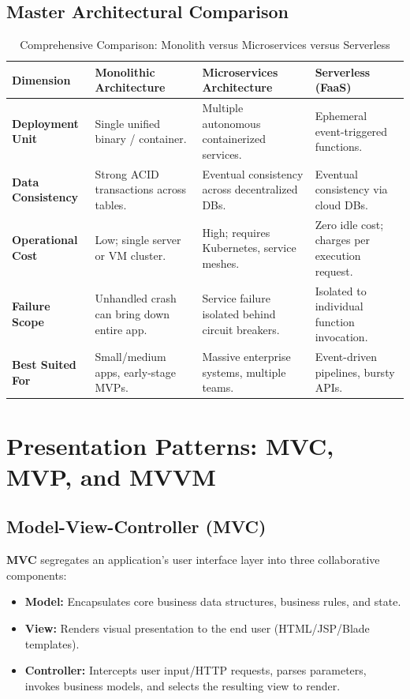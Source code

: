 \subsection{Master Architectural Comparison}
\begin{table}[htbp]
\centering
\small
\caption{Comprehensive Comparison: Monolith versus Microservices versus Serverless}
\label{tab:monolith_vs_microservices_vs_serverless}
\begin{tabularx}{\textwidth}{l p{3.8cm} p{4.2cm} X}
\toprule
\textbf{Dimension} & \textbf{Monolithic Architecture} & \textbf{Microservices Architecture} & \textbf{Serverless (FaaS)} \\
\midrule
\textbf{Deployment Unit} & Single unified binary / container. & Multiple autonomous containerized services. & Ephemeral event-triggered functions. \\
\textbf{Data Consistency} & Strong ACID transactions across tables. & Eventual consistency across decentralized DBs. & Eventual consistency via cloud DBs. \\
\textbf{Operational Cost} & Low; single server or VM cluster. & High; requires Kubernetes, service meshes. & Zero idle cost; charges per execution request. \\
\textbf{Failure Scope} & Unhandled crash can bring down entire app. & Service failure isolated behind circuit breakers. & Isolated to individual function invocation. \\
\textbf{Best Suited For} & Small/medium apps, early-stage MVPs. & Massive enterprise systems, multiple teams. & Event-driven pipelines, bursty APIs. \\
\bottomrule
\end{tabularx}
\end{table}

\section{Presentation Patterns: MVC, MVP, and MVVM}
\label{sec:se_mvc_mvp_mvvm}

\subsection{Model-View-Controller (MVC)}
\textbf{MVC} segregates an application's user interface layer into three collaborative components:
\begin{itemize}
    \item \textbf{Model:} Encapsulates core business data structures, business rules, and state.
    \item \textbf{View:} Renders visual presentation to the end user (HTML/JSP/Blade templates).
    \item \textbf{Controller:} Intercepts user input/HTTP requests, parses parameters, invokes business models, and selects the resulting view to render.
\end{itemize}

